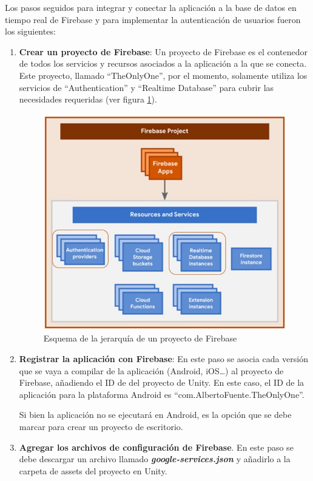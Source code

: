 Los pasos seguidos para integrar y conectar la aplicación a la base de datos en tiempo real de Firebase y para implementar la autenticación de usuarios fueron los siguientes:
\begin{enumerate}
    \item \textbf{Crear un proyecto de Firebase}: Un proyecto de Firebase es el contenedor de todos los servicios y recursos asociados a la aplicación a la que se conecta. Este proyecto, llamado ``TheOnlyOne'', por el momento, solamente utiliza los servicios de ``Authentication'' y ``Realtime Database'' para cubrir las necesidades requeridas (ver figura \ref{fig:JerarquíaFirebase}).
    
    \begin{figure}[h]
    \centering
    \includegraphics[scale=0.45]{img/HierarchyFirebaseProject.jpg}
    \caption{Esquema de la jerarquía de un proyecto de Firebase}
    \label{fig:JerarquíaFirebase}
    \end{figure}
    
    \item \textbf{Registrar la aplicación con Firebase}: En este paso se asocia cada versión que se vaya a compilar de la aplicación (Android, iOS…) al proyecto de Firebase, añadiendo el ID de del proyecto de Unity. En este caso, el ID de la aplicación para la plataforma Android es ``com.AlbertoFuente.TheOnlyOne''. 
    
    Si bien la aplicación no se ejecutará en Android, es la opción que se debe marcar para crear un proyecto de escritorio.
     \item \textbf{Agregar los archivos de configuración de Firebase}. En este paso se debe descargar un archivo llamado \textbf{\textit{google-services.json}} y añadirlo a la carpeta de assets del proyecto en Unity.
     

\end{enumerate}
